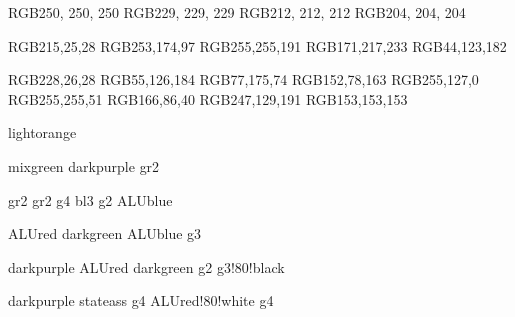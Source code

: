 \definecolor{gr1}		{RGB}{250, 250, 250}
\definecolor{gr2}		{RGB}{229, 229, 229}
\definecolor{gr3}		{RGB}{212, 212, 212}
\definecolor{gr4}		{RGB}{204, 204, 204}

\definecolor{g1}		{RGB}{215,25,28} %
\definecolor{g2}		{RGB}{253,174,97} %
\definecolor{g3}		{RGB}{255,255,191} %
\definecolor{g4}		{RGB}{171,217,233} %
\definecolor{g5}		{RGB}{44,123,182} %

\definecolor{s1}		{RGB}{228,26,28}
\definecolor{s2}		{RGB}{55,126,184}
\definecolor{s3}		{RGB}{77,175,74}
\definecolor{s4}		{RGB}{152,78,163}
\definecolor{s5}		{RGB}{255,127,0}
\definecolor{s6}		{RGB}{255,255,51}
\definecolor{s7}		{RGB}{166,86,40}
\definecolor{s8}		{RGB}{247,129,191}
\definecolor{s9}		{RGB}{153,153,153}

		{lightorange}

		{mixgreen}
		{darkpurple}
	{gr2}

		{gr2} %
				{gr2} %
				{g4} %
			{bl3} %
			{g2}
		{ALUblue}

			{ALUred}
			{darkgreen}
			{ALUblue}
		{g3}

		{darkpurple}
		{ALUred}
		{darkgreen}
		{g2}
		{g3!80!black}


			{darkpurple}
			{stateass}
			{g4}
			{ALUred!80!white}
			{g4}








